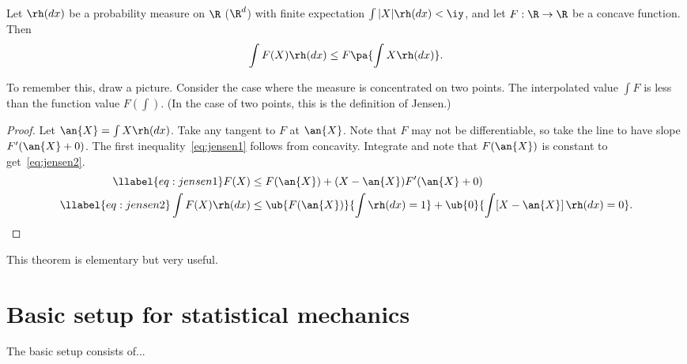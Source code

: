 

\begin{thm}
Let $\rh(dx)$ be a probability measure on $\R$ ($\R^d$) with finite expectation $\int |X| \rh(dx)<\iy$, and let $F:\R\to \R$ be a concave function. Then
\[
\int F(X)\rh(dx) \le F\pa{\int X\rh(dx)}.
\]
\end{thm}
To remember this, draw a picture. Consider the case where the measure is concentrated on two points. The interpolated value $\int F$ is less than the function value $F(\int)$. (In the case of two points, this is the definition of Jensen.)


\begin{proof}
Let $\an{X} = \int X\rh(dx)$. Take any tangent to $F$ at $\an{X}$. 
Note that $F$ may not be differentiable, so take the line to have slope $F'(\an{X}+0)$.
The first inequality~\eqref{eq:jensen1} follows from concavity.
Integrate and note that $F(\an{X})$ is constant to get~\eqref{eq:jensen2}.
\begin{align}
\llabel{eq:jensen1}
F(X) &\le F(\an{X}) + (X-\an{X}) F'(\an{X}+0)\\
\llabel{eq:jensen2}
\int F(X)\rh(dx)& \le \ub{F(\an{X})}{\int \rh(dx)=1} + \ub{0}{\int [X-\an{X}]\,\rh(dx)=0}.
\end{align}
\end{proof}
This theorem is elementary but very useful. 

\section{Basic setup for statistical mechanics}

The basic setup consists of... 


